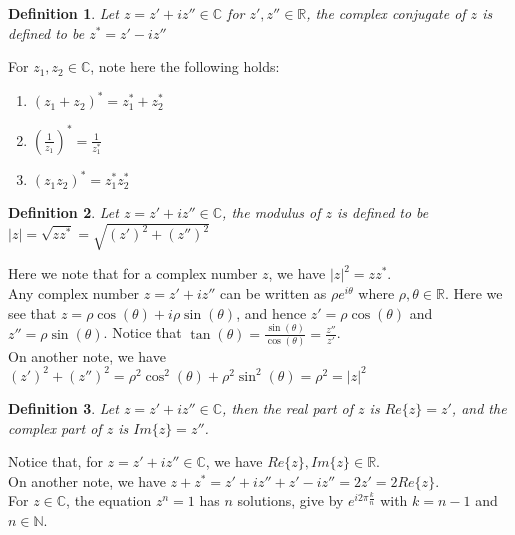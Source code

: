 \documentclass[11pt]{article}
\theoremstyle{break}
\theoremstyle{break}
\newtheorem{defn}{Definition}[corL]
\newcommand{\R}{\mathbb{R}}
\newcommand{\N}{\mathbb{N}}
\newcommand{\Complex}{\mathbb{C}}
\begin{document}
\begin{defn}
Let $z=z'+iz'' \in \Complex$ for $z',z''\in \R$, the complex conjugate of $z$ is defined to be $z^*=z'-iz''$
\end{defn}

For $z_1,z_2 \in \Complex$, note here the following holds:
\begin{enumerate}[topsep=3pt,itemsep=-1ex,partopsep=1ex,parsep=1ex]
\item $(z_1+z_2)^* = z_1^*+z_2^*$		
\item $\left(\frac{1}{z_1}\right)^* = \frac{1}{z_1^*}$
\item $(z_1z_2)^* = z_1^*z_2^*$
\end{enumerate}

\begin{defn}
Let $z = z'+iz'' \in \Complex$, the modulus of $z$ is defined to be $|z|  = \sqrt{zz^*} = \sqrt{(z')^2+(z'')^2}$
\end{defn}

Here we note that for a complex number $z$, we have $|z|^2 = zz^*$.\\

Any complex number $z = z'+iz''$ can be written as $\rho e^{i\theta}$ where $\rho,\theta \in \R$.
Here we see that $z = \rho \cos(\theta)+i\rho\sin(\theta)$, and hence $z' = \rho \cos(\theta)$ and $z'' = \rho\sin(\theta)$. Notice that $\tan(\theta) = \frac{\sin(\theta)}{\cos(\theta)} = \frac{z''}{z'}$.\\
On another note, we have $(z')^2 + (z'')^2 = \rho^2\cos^2(\theta)+\rho^2\sin^2(\theta) = \rho^2 = |z|^2$\\

\begin{defn}
Let $z = z'+iz'' \in \Complex$, then the real part of $z$ is $Re\{z\} = z'$, and the complex part of $z$ is $Im\{z\} = z''$.
\end{defn}

Notice that, for $z = z'+iz'' \in \Complex$, we have $Re\{z\}, Im\{z\} \in \R$.\\
On another note, we have $z+z^* = z'+iz''+z'-iz'' = 2z' = 2Re\{z\}$.\\

For $z \in \Complex$, the equation $z^n = 1$ has $n$ solutions, give by $e^{i2\pi \frac{k}{n}}$ with $k=n-1$ and $n \in \N$.\\
\end{document}
